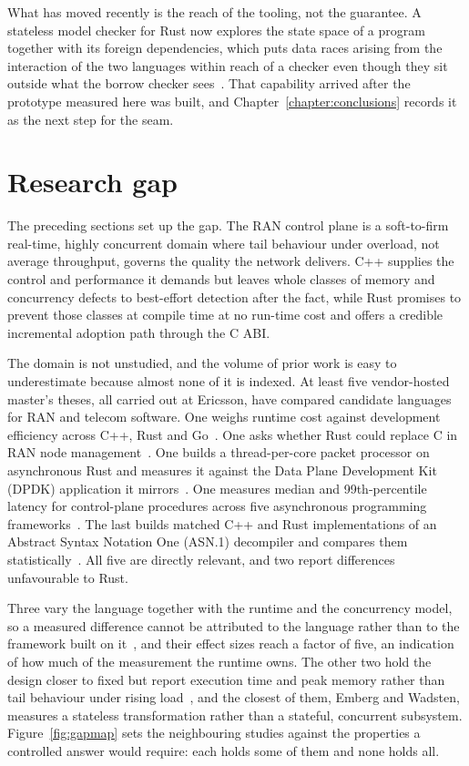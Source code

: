 What has moved recently is the reach of the tooling, not the guarantee. A stateless model checker
for Rust now explores the state space of a program together with its foreign dependencies, which
puts data races arising from the interaction of the two languages within reach of a checker even
though they sit outside what the borrow checker sees~\cite{pearce2026rustmc}. That capability
arrived after the prototype measured here was built, and Chapter~\ref{chapter:conclusions} records
it as the next step for the seam.

\section{Research gap}\label{sec:gap}
The preceding sections set up the gap. The RAN control plane is a soft-to-firm real-time, highly
concurrent domain where tail behaviour under overload, not average throughput, governs the quality
the network delivers. C++ supplies the control and performance it demands but leaves whole classes
of memory and concurrency defects to best-effort detection after the fact, while Rust promises to
prevent those classes at compile time at no run-time cost and offers a credible incremental
adoption path through the C ABI.

The domain is not unstudied, and the volume of prior work is easy to underestimate because almost
none of it is indexed. At least five vendor-hosted master's theses, all carried out at Ericsson,
have compared candidate languages for RAN and telecom software. One weighs runtime cost against
development efficiency across C++, Rust and Go~\cite{karlback2021ran}. One asks whether Rust could
replace C in RAN node management~\cite{olsson2023ranmgmt}. One builds a thread-per-core packet
processor on asynchronous Rust and measures it against the Data Plane Development Kit (DPDK)
application it mirrors~\cite{olsson2023asyncpackets}. One measures median and 99th-percentile
latency for control-plane procedures across five asynchronous programming
frameworks~\cite{arvidsson2025async}. The last builds matched C++ and Rust implementations of an
Abstract Syntax Notation One (ASN.1) decompiler and compares them
statistically~\cite{emberg2023asn1}. All five are directly relevant, and two report differences
unfavourable to Rust.

Three vary the language together with the runtime and the concurrency model, so a measured
difference cannot be attributed to the language rather than to the framework built on
it~\cite{karlback2021ran,olsson2023asyncpackets,arvidsson2025async}, and their effect sizes reach
a factor of five, an indication of how much of the measurement the runtime owns. The other two
hold the design closer to fixed but report execution time and peak memory rather than tail
behaviour under rising load~\cite{olsson2023ranmgmt,emberg2023asn1}, and the closest of them,
Emberg and Wadsten, measures a stateless transformation rather than a stateful, concurrent
subsystem. Figure~\ref{fig:gapmap} sets the neighbouring studies against the properties a
controlled answer would require: each holds some of them and none holds all.

